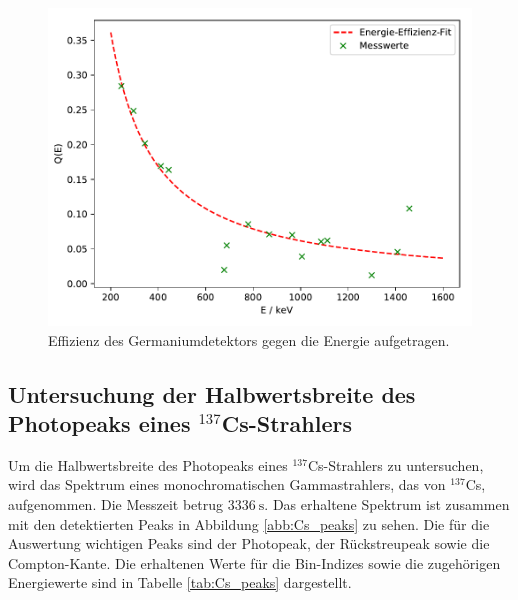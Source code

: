 \FloatBarrier
\begin{figure}
    \centering
    \includegraphics[scale=0.7]{effizienz.pdf}
    \caption{Effizienz des Germaniumdetektors gegen die Energie aufgetragen.}
    \label{abb:effizienz}
\end{figure}
\FloatBarrier

\subsection{Untersuchung der Halbwertsbreite des Photopeaks eines $^{137}$Cs-Strahlers}

Um die Halbwertsbreite des Photopeaks eines $^{137}$Cs-Strahlers zu untersuchen,
wird das Spektrum eines monochromatischen Gammastrahlers, das von $^{137}$Cs,
aufgenommen. Die Messzeit betrug $\SI{3336}{\second}$. Das erhaltene Spektrum ist zusammen mit den detektierten Peaks in
Abbildung \ref{abb:Cs_peaks} zu sehen. Die für die Auswertung wichtigen Peaks sind der
Photopeak, der Rückstreupeak sowie die Compton-Kante. Die erhaltenen Werte für die
Bin-Indizes sowie die zugehörigen Energiewerte sind in Tabelle \ref{tab:Cs_peaks}
dargestellt.

